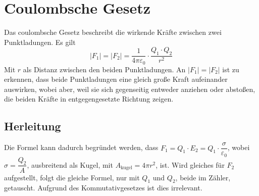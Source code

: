 \documentclass{article}
\begin{document}
\section{Coulombsche Gesetz} 
Das coulombsche Gesetz beschreibt die wirkende Kräfte zwischen zwei Punktladungen.
Es gilt
\[
 \vert F_1 \vert = \vert F_2 \vert = \frac{1}{4 \pi \varepsilon_0} \cdot \frac{Q_1 \cdot Q_2}{r^2} 
\]
Mit $r$ als Distanz zwischen den beiden Punktladungen. An $\vert F_1 \vert = \vert F_2 \vert$ ist zu erkennen, dass beide Punktladungen eine gleich große Kraft aufeinander auswirken, wobei aber, weil sie sich gegenseitig entweder anziehen oder abstoßen, die beiden Kräfte in entgegengesetzte Richtung zeigen.
\subsection{Herleitung}
Die Formel kann dadurch begründet werden, dass $F_1 = Q_1 \cdot E_2=Q_1 \cdot \dfrac{\sigma}{\varepsilon_0}$, wobei $\sigma = \dfrac{Q_2}{A}$, ausbreitend als Kugel, mit $A_{\text{kugel}} = 4 \pi r^2$, ist. Wird gleiches für $F_2$ aufgestellt, folgt die gleiche Formel, nur mit $Q_1$ und $Q_2$, beide im Zähler, getauscht. Aufgrund des Kommutativgesetzes ist dies irrelevant.
 
\end{document}
